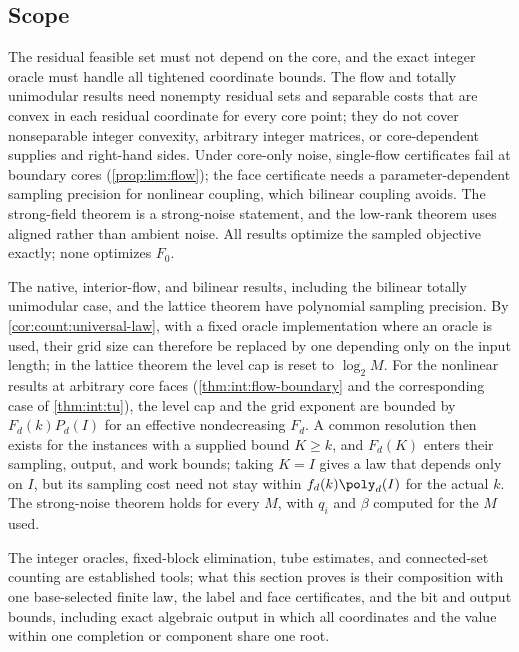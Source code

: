 \subsection{Scope}\label{sec:int:scope}

The residual feasible set must not depend on the core, and the exact integer
oracle must handle all tightened coordinate bounds. The flow and totally
unimodular results need nonempty residual sets and separable costs that are
convex in each residual coordinate for every core point; they do not cover
nonseparable integer convexity, arbitrary integer matrices, or core-dependent
supplies and right-hand sides. Under core-only noise, single-flow certificates
fail at boundary cores (\cref{prop:lim:flow}); the face certificate needs a
parameter-dependent sampling precision for nonlinear coupling, which bilinear
coupling avoids. The strong-field theorem is a strong-noise statement, and the
low-rank theorem uses aligned rather than ambient noise. All results optimize
the sampled objective exactly; none optimizes $F_0$.

The native, interior-flow, and bilinear results, including the bilinear
totally unimodular case, and the lattice theorem have polynomial sampling
precision. By \cref{cor:count:universal-law}, with a fixed oracle
implementation where an oracle is used, their grid size can therefore be
replaced by one depending only on the input length; in the lattice theorem
the level cap is reset to $\log_2M$. For the nonlinear results at arbitrary
core faces (\cref{thm:int:flow-boundary} and the corresponding case of
\cref{thm:int:tu}), the level cap and the grid exponent are bounded by
$F_d(k)P_d(I)$ for an effective nondecreasing $F_d$. A common resolution then
exists for the instances with a supplied bound $K\ge k$, and $F_d(K)$ enters
their sampling, output, and work bounds; taking $K=I$ gives a law that
depends only on $I$, but its sampling cost need not stay within
$f_d(k)\poly_d(I)$ for the actual $k$. The strong-noise theorem holds for
every $M$, with $q_i$ and $\beta$ computed for the $M$ used.

The integer oracles, fixed-block elimination, tube estimates, and
connected-set counting are established tools; what this section proves is
their composition with one base-selected finite law, the label and face
certificates, and the bit and output bounds, including exact algebraic output
in which all coordinates and the value within one completion or component
share one root.

